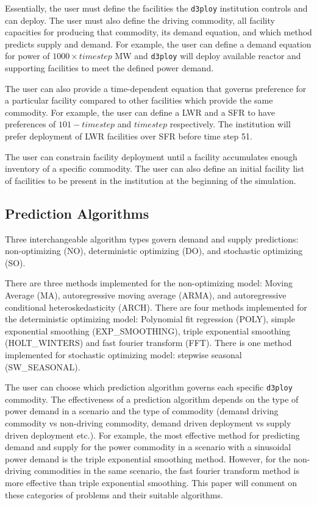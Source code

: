 \documentclass[11pt,letterpaper]{article}
\newcommand{\deploy}{\texttt{d3ploy}\xspace}%
\begin{document}
Essentially, the user must define the facilities the 
\deploy institution controls and can deploy. 
The user must also define the driving commodity, all facility capacities 
for producing that commodity, its demand 
equation, and which method predicts supply and demand. 
For example, the user can define a demand equation for power of 
$1000 \times timestep$ MW and \deploy will deploy available reactor and supporting 
facilities to meet the defined power demand. 

The user can also provide a time-dependent equation that governs
preference for a particular facility compared to other facilities which 
provide the same commodity. 
For example, the user can define a \gls{LWR} and a \gls{SFR} to have
preferences of $101 - timestep$ and $timestep$ respectively. 
The institution will prefer deployment of \gls{LWR} facilities over 
\gls{SFR} before time step 51. 

The user can constrain facility deployment 
until a facility accumulates enough inventory of a specific commodity.  
The user can also define an initial facility list of facilities to be 
present in the institution at the beginning of the simulation. 

\subsection{\textbf{Prediction Algorithms}}
Three interchangeable algorithm types govern demand and supply 
predictions: non-optimizing (NO), deterministic optimizing (DO), and stochastic
optimizing (SO). 

There are three methods implemented for the non-optimizing model: 
Moving Average (MA), autoregressive moving average (ARMA), and autoregressive 
conditional heteroskedasticity (ARCH).
There are four methods implemented for the deterministic optimizing model: 
Polynomial fit regression (POLY), simple exponential smoothing (EXP\_SMOOTHING),  
triple exponential smoothing (HOLT\_WINTERS) and fast fourier 
transform (FFT). 
There is one method implemented for stochastic optimizing model: 
stepwise seasonal (SW\_SEASONAL).  

The user can choose which prediction algorithm governs each specific 
\deploy commodity. 
The effectiveness of a prediction algorithm depends on the type 
of power demand in a scenario and the type of commodity (demand 
driving commodity vs non-driving commodity, demand driven 
deployment vs supply driven deployment etc.). 
For example, the most effective method
for predicting demand and supply for the power commodity in a scenario  
with a sinusoidal power demand is the triple exponential smoothing method. 
However, for the non-driving commodities in the same 
scenario, the fast fourier transform method is more effective than triple 
exponential smoothing. 
This paper will comment on these categories of problems and their suitable
algorithms. 
\end{document}
